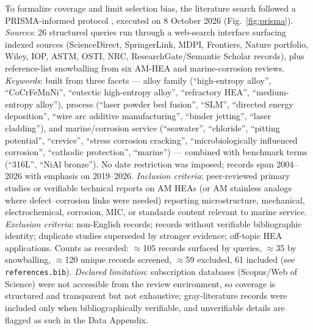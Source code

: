 To formalize coverage and limit selection bias, the literature search followed a PRISMA-informed protocol \cite{prisma2020}, executed on 8 October 2026 (Fig.~\ref{fig:prisma}). \emph{Sources}: 26 structured queries run through a web-search interface surfacing indexed sources (ScienceDirect, SpringerLink, MDPI, Frontiers, Nature portfolio, Wiley, IOP, ASTM, OSTI, NRC, ResearchGate/Semantic Scholar records), plus reference-list snowballing from six AM-HEA and marine-corrosion reviews. \emph{Keywords}: built from three facets --- alloy family (``high-entropy alloy'', ``CoCrFeMnNi'', ``eutectic high-entropy alloy'', ``refractory HEA'', ``medium-entropy alloy''), process (``laser powder bed fusion'', ``SLM'', ``directed energy deposition'', ``wire arc additive manufacturing'', ``binder jetting'', ``laser cladding''), and marine/corrosion service (``seawater'', ``chloride'', ``pitting potential'', ``crevice'', ``stress corrosion cracking'', ``microbiologically influenced corrosion'', ``cathodic protection'', ``marine'') --- combined with benchmark terms (``316L'', ``NiAl bronze''). No date restriction was imposed; records span 2004--2026 with emphasis on 2019--2026. \emph{Inclusion criteria}: peer-reviewed primary studies or verifiable technical reports on AM HEAs (or AM stainless analogs where defect--corrosion links were needed) reporting microstructure, mechanical, electrochemical, corrosion, MIC, or standards content relevant to marine service. \emph{Exclusion criteria}: non-English records; records without verifiable bibliographic identity; duplicate studies superseded by stronger evidence; off-topic HEA applications. Counts as recorded: $\approx$105 records surfaced by queries, $\approx$35 by snowballing, $\approx$120 unique records screened, $\approx$59 excluded, 61 included (see \texttt{references.bib}). \emph{Declared limitation}: subscription databases (Scopus/Web of Science) were not accessible from the review environment, so coverage is structured and transparent but not exhaustive; gray-literature records were included only when bibliographically verifiable, and unverifiable details are flagged as such in the Data Appendix.

